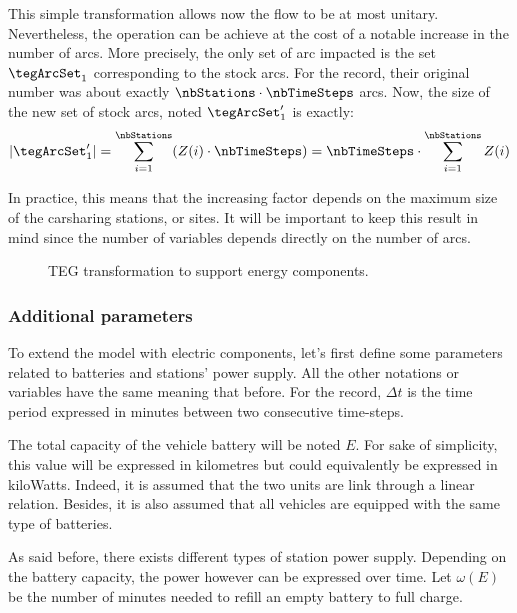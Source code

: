 \begin{bibunit}[ieeetr]
\medskip
This simple transformation allows now the flow to be at most unitary.
Nevertheless, the operation can be achieve at the cost of a notable increase in the number of arcs.
More precisely, the only set of arc impacted is the set $\tegArcSet_1$ corresponding to the stock arcs.
For the record, their original number was about exactly $\nbStations \cdot \nbTimeSteps$ arcs.
Now, the size of the new set of stock arcs, noted $\tegArcSet_1'$ is exactly:
\begin{equation}
|\tegArcSet_1'| = \sum\limits_{i=1}^\nbStations (Z(i) \cdot \nbTimeSteps) = \nbTimeSteps \cdot \sum\limits_{i=1}^\nbStations Z(i)
\end{equation}

In practice, this means that the increasing factor depends on the maximum size of the carsharing stations, or sites.
It will be important to keep this result in mind since the number of variables depends directly on the number of arcs.

\begin{figure}[t]
\begin{center}
\scalebox{0.7}{}
\end{center}
\caption{TEG transformation to support energy components.}
\label{fig:tegTransformation}
\end{figure}

\subsubsection{Additional parameters}
To extend the model with electric components, let's first define some parameters related to batteries and stations' power supply.
All the other notations or variables have the same meaning that before.
For the record, $\Delta t$ is the time period expressed in minutes between two consecutive time-steps.

The total capacity of the vehicle battery will be noted $E$.
For sake of simplicity, this value will be expressed in kilometres but could equivalently be expressed in kiloWatts.
Indeed, it is assumed that the two units are link through a linear relation.
Besides, it is also assumed that all vehicles are equipped with the same type of batteries.

\medskip
As said before, there exists different types of station power supply.
Depending on the battery capacity, the power however can be expressed over time.
Let $\omega (E)$ be the number of minutes needed to refill an empty battery to full charge.


\end{bibunit}
